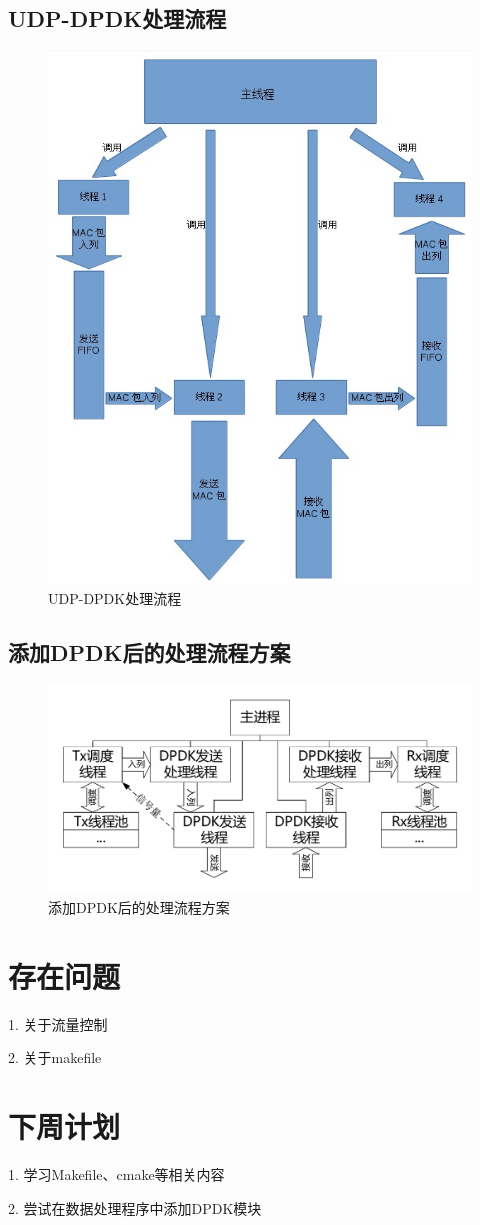 \documentclass{article}
\begin{document}
\subsection{UDP-DPDK处理流程}
\begin{figure}[H]
	\centering
	\includegraphics[width = .6\textwidth]{frame_dpdk.jpg}
	\caption{UDP-DPDK处理流程}
\end{figure}

\subsection{添加DPDK后的处理流程方案}
\begin{figure}[H]
	\centering
	\includegraphics[width = .8\textwidth]{frame_step2.pdf}
	\caption{添加DPDK后的处理流程方案}
\end{figure}

\section{存在问题}
1. 关于流量控制

2. 关于makefile

\section{下周计划}
1. 学习Makefile、cmake等相关内容

2. 尝试在数据处理程序中添加DPDK模块
\end{document}

